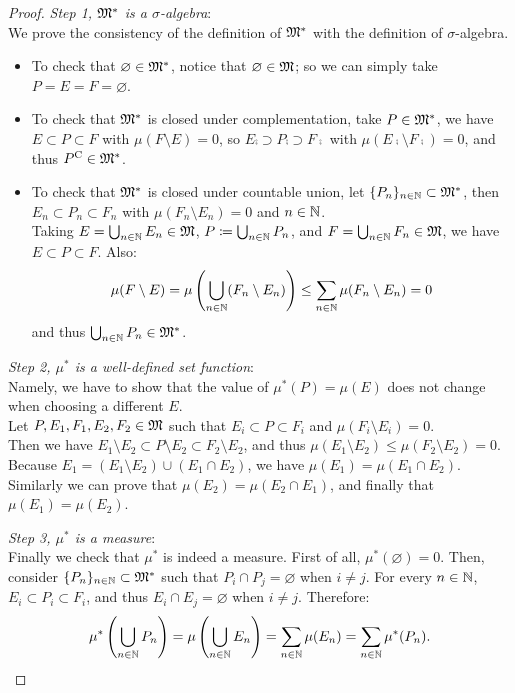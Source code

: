 \begin{proof} 
	\textit{Step 1, $\mathfrak M^*$ is a $\sigma$-algebra}:\\
	We prove the consistency of the definition of $\mathfrak M^*$ with the definition of $\sigma$-algebra. 
	\begin{itemize}
		\item To check that $\varnothing \in \mathfrak M^*$, notice that $\varnothing \in \mathfrak M$; so we can simply take $P = E = F = \varnothing$.
		\item To check that $\mathfrak M^*$ is closed under complementation, take $P \in \mathfrak M^*$, we have $E \subset P \subset F$ with $\mu(F \setminus E) = 0$, so $E\comp \supset P\comp \supset F\comp$ with $\mu(E\comp \setminus F\comp) = 0$, and thus $P^{\mathrm{C}} \in \mathfrak M^*$.
		\item To check that $\mathfrak M^*$ is closed under countable union, let $\{P_n\}_{n \in \mathbb N} \subset \mathfrak M^*$, then $E_n \subset P_n \subset F_n$ with $\mu(F_n \setminus E_n) = 0$ and $n \in \mathbb N$. \\
		Taking $E = \bigcup_{n \in \mathbb N} E_n \in \mathfrak M$, $P \coloneqq \bigcup_{n \in \mathbb N} P_n$, and $F = \bigcup_{n \in \mathbb N} F_n \in \mathfrak M$, we have $E \subset P \subset F$. Also:
		$$\mu(F \setminus E)
		= \mu \left(\bigcup_{n \in \mathbb N} (F_n \setminus E_n) \right)
		\le \sum_{n \in \mathbb N} \mu(F_n \setminus E_n) = 0$$
		and thus $\bigcup_{n \in \mathbb N} P_n \in \mathfrak M^*$.
	\end{itemize}

	\textit{Step 2, $\mu^*$ is a well-defined set function}:\\
	Namely, we have to show that the value of $\mu^*(P) = \mu(E)$ does not change when choosing a different $E$. \\
	Let $P, E_1, F_1, E_2, F_2 \in \mathfrak M$ such that $E_i \subset P \subset F_i$ and $\mu(F_i \setminus E_i) = 0$. \\
	Then we have $E_1 \setminus E_2 \subset P \setminus E_2 \subset F_2 \setminus E_2$, and thus $\mu(E_1 \setminus E_2) \le \mu(F_2 \setminus E_2) = 0$.\\
	Because $E_1 = (E_1 \setminus E_2) \cup (E_1 \cap E_2)$, we have $\mu(E_1) = \mu(E_1 \cap E_2)$. Similarly we can prove that $\mu(E_2) = \mu(E_2 \cap E_1)$, and finally that $\mu(E_1) = \mu(E_2)$.

	\textit{Step 3, $\mu^*$ is a measure}:\\
	Finally we check that $\mu^*$ is indeed a measure. First of all, $\mu^*(\varnothing) = 0$. Then, consider $\{P_n\}_{n \in \mathbb N} \subset \mathfrak M^*$ such that $P_i \cap P_j = \varnothing$ when $i \neq j$. For every $n \in \mathbb N$, $E_i \subset P_i \subset F_i$, and thus $E_i \cap E_j = \varnothing$ when $i \neq j$. Therefore:
	$$
		\mu^* \left( \bigcup_{n \in \mathbb N} P_n \right)
		= \mu \left( \bigcup_{n \in \mathbb N} E_n \right)
		= \sum_{n \in \mathbb N} \mu(E_n)
		= \sum_{n \in \mathbb N} \mu^*(P_n)
	.
	$$
\end{proof}
